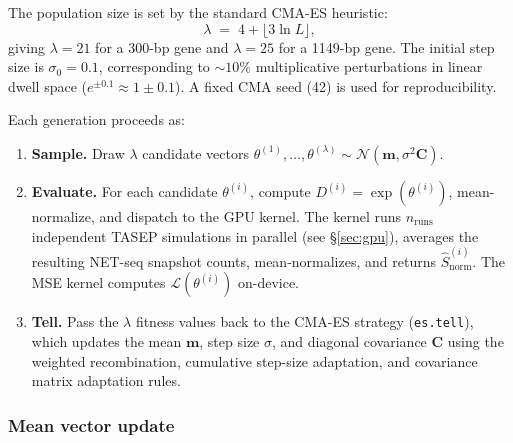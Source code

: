 \documentclass[11pt]{article}
\begin{document}
The population size is set by the standard CMA-ES heuristic:
\begin{equation}
  \lambda \;=\; 4 + \lfloor 3 \ln L \rfloor,
\end{equation}
giving $\lambda = 21$ for a 300-bp gene and $\lambda = 25$ for a 1149-bp gene.
The initial step size is $\sigma_0 = 0.1$, corresponding to $\sim 10\%$
multiplicative perturbations in linear dwell space ($e^{\pm 0.1} \approx 1
\pm 0.1$). A fixed CMA seed (42) is used for reproducibility.

Each generation proceeds as:
\begin{enumerate}
  \item \textbf{Sample.} Draw $\lambda$ candidate vectors
    $\theta^{(1)}, \ldots, \theta^{(\lambda)} \sim \mathcal{N}(\mathbf{m},
    \sigma^2 \mathbf{C})$.

  \item \textbf{Evaluate.} For each candidate $\theta^{(i)}$, compute
    $D^{(i)} = \exp(\theta^{(i)})$, mean-normalize, and dispatch to the GPU
    kernel. The kernel runs $n_{\text{runs}}$ independent TASEP simulations
    in parallel (see \S\ref{sec:gpu}), averages the resulting NET-seq snapshot
    counts, mean-normalizes, and returns $\hat{S}_{\text{norm}}^{(i)}$. The
    MSE kernel computes $\mathcal{L}(\theta^{(i)})$ on-device.

  \item \textbf{Tell.} Pass the $\lambda$ fitness values back to the CMA-ES
    strategy (\texttt{es.tell}), which updates the mean $\mathbf{m}$, step
    size $\sigma$, and diagonal covariance $\mathbf{C}$ using the
    weighted recombination, cumulative step-size adaptation, and covariance
    matrix adaptation rules.
\end{enumerate}

\subsubsection*{Mean vector update}
\end{document}
